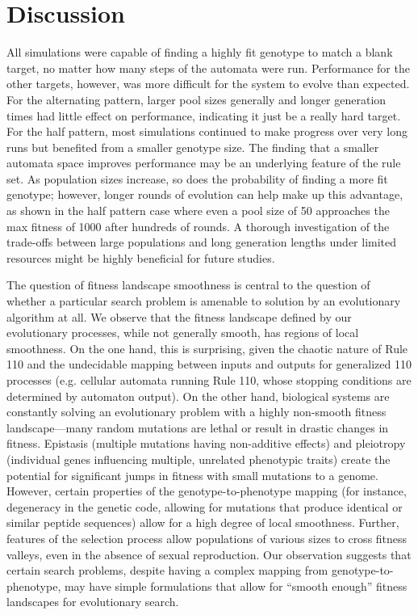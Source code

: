 \documentclass[twocolumn]{article}
\begin{document}
\section{Discussion}


All simulations were capable of finding a highly fit genotype to match a blank target, no matter how many steps of the automata were run.  Performance for the other targets, however, was more difficult for the system to evolve than expected.  For the alternating pattern, larger pool sizes generally and longer generation times had little effect on performance, indicating it just be a really hard target.  For the half pattern, most simulations continued to make progress over very long runs but benefited from a smaller genotype size.  The finding that a smaller automata space improves performance may be an underlying feature of the rule set.  As population sizes increase, so does the probability of finding a more fit genotype; however, longer rounds of evolution can help make up this advantage, as shown in the half pattern case where even a pool size of 50 approaches the max fitness of 1000 after hundreds of rounds.  A thorough investigation of the trade-offs between large populations and long generation lengths under limited resources might be highly beneficial for future studies.


The question of fitness landscape smoothness is central to the question of whether a particular search problem is amenable to solution by an evolutionary algorithm at all. We observe that the fitness landscape defined by our evolutionary processes, while not generally smooth, has regions of local smoothness. On the one hand, this is surprising, given the chaotic nature of Rule 110 and the undecidable mapping between inputs and outputs for generalized 110 processes (e.g. cellular automata running Rule 110, whose stopping conditions are determined by automaton output). On the other hand, biological systems are constantly solving an evolutionary problem with a highly non-smooth fitness landscape---many random mutations are lethal or result in drastic changes in fitness. Epistasis (multiple mutations having non-additive effects) and pleiotropy (individual genes influencing multiple, unrelated phenotypic traits) create the potential for significant jumps in fitness with small mutations to a genome. \cite{Ostman:2012iq} However, certain properties of the genotype-to-phenotype mapping (for instance, degeneracy in the genetic code, allowing for mutations that produce identical or similar peptide sequences) allow for a high degree of local smoothness.  Further, features of the selection process allow populations of various sizes to cross fitness valleys, even in the absence of sexual reproduction. \cite{Weissman:2009dh} Our observation suggests that certain search problems, despite having a complex mapping from genotype-to-phenotype, may have simple formulations that allow for ``smooth enough'' fitness landscapes for evolutionary search. 
\end{document}
